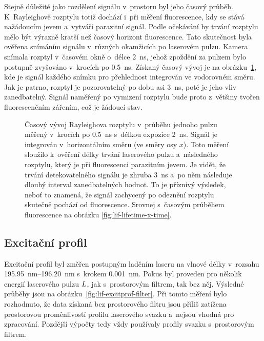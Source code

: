 Stejně důležité jako rozdělení signálu v~prostoru byl jeho časový průběh.
K~Rayleighově rozptylu totiž dochází i~při měření fluorescence,
kdy se stává nažádoucím jevem a~vytváří parazitní signál.
Podle očekávání by trvání rozptylu mělo být výrazně kratší
než časový horizont fluorescence.
Tato skutečnost byla ověřena snímáním signálu v~různých okamžicích
po laserovém pulzu.
Kamera snímala rozptyl v~časovém okně o~délce \SI{2}{\nano\second},
jehož zpoždění za pulzem bylo postupně zvyšováno v~krocích
po \SI{0.5}{\nano\second}.
Získaný časový vývoj je na obrázku~\ref{fig:lif-rayleigh-time},
kde je signál každého snímku pro přehlednost integrován ve vodorovném směru.
Jak je patrno, rozptyl je pozorovatelný po dobu asi \SI{3}{\nano\second},
poté je jeho vliv zanedbatelný.
Signál naměřený po vymizení rozptylu bude proto z~většiny tvořen
fluorescenčním zářením, což je žádoucí stav.

\begin{figure}[hbp]
	\centering
	
	\caption{Časový vývoj Rayleighova rozptylu v~průběhu jednoho pulzu
		měřený v~krocích po \SI{0.5}{\nano\second}
		s~délkou expozice \SI{2}{\nano\second}.
		Signál je integrován v~horizontálním směru (ve směry osy $x$).
		Toto měření sloužilo k~ověření délky trvání laserového pulzu
		a~následného rozptylu, který je při fluorescenci parazitním jevem.
		Je vidět, že trvání detekovatelného signálu je zhruba
		\SI{3}{\nano\second} a~po něm následuje dlouhý interval
		zanedbatelných hodnot.
		To je příznivý výsledek, neboť to znamená, že signál zachycený
		po odeznění rozptylu skutečně pochází od fluorescence.
		Srovnej s~časovým průběhem fluorescence
		na obrázku \ref{fig:lif-lifetime-x-time}.}
	\label{fig:lif-rayleigh-time}
\end{figure}

\subsection{Excitační profil}
\label{sec:lif-excitprof}
Excitační profil byl změřen postupným laděním laseru na vlnové délky
v~rozsahu \SIrange{195.95}{196.20}{\nano\metre}
s~krokem \SI{0.001}{\nano\metre}.
Pokus byl proveden pro několik energií laserového pulzu $L$,
jak s~prostorovým filtrem, tak bez něj.
Výsledné průběhy jsou na obrázku~\ref{fig:lif-excitprof-filter}.
Při tomto měření bylo rozhodnuto, že data získaná bez prostorového
filtru jsou příliš zatížena prostorovou proměnlivostí profilu laserového
svazku a~nejsou vhodná pro zpracování.
Pozdější výpočty tedy vždy používaly profily svazku s~prostorovým filtrem.

